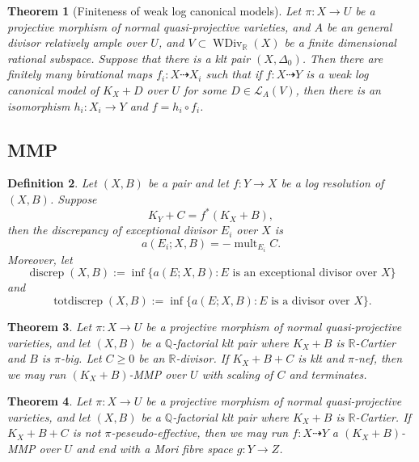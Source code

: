 \documentclass{article}
\newtheorem{defn}{Definition}[subsection]
\newtheorem{thm}[defn]{Theorem}
\begin{document}
\begin{thm}[Finiteness of weak log canonical models]\label{finitewlcm}
\cite[Theorem E]{birkarExistenceMinimalModels2009}
   Let $\pi:X\to U$ be a projective morphism of normal quasi-projective varieties, and $A$ be an general divisor relatively ample over $U$, and $V \subset \operatorname{WDiv}_{\mathbb{R}}(X)$ be a finite dimensional rational subspace. Suppose that there is a klt pair $(X,\Delta_{0})$. Then there are finitely many birational maps $f_{i}:X \dashrightarrow X_{i}$ such that if $f:X \dashrightarrow  Y$ is a weak log canonical model of $K_{X}+D$ over $U$ for some $D \in \mathcal{L}_{A}(V)$, then there is an isomorphism  $h_{i}:X_{i} \to Y$  and $f=h_{i}\circ f_{i}$.  

\end{thm}


\subsection{MMP}
\begin{defn}
  Let $(X,B)$ be a pair  and let  $f:Y\to X$ be a log resolution of $(X,B)$. Suppose
  \[
  K_{Y}+C=f^*(K_{X}+B)
  ,\]
then the discrepancy  of exceptional divisor $E_{i}$ over $X$ is
\[
  a(E_{i};X,B)=-\operatorname{mult}_{E_{i}}C
.\]
 Moreover, let
\[
  \operatorname{discrep}(X, B) := \operatorname{inf}\{a(E; X, B) : E \text{ is an exceptional divisor over } X \}
\]
and
\[
  \operatorname{totdiscrep}(X, B) :=\operatorname{inf}\{a(E; X, B) : E \text{ is a divisor over } X\}.
\]
\end{defn}
\begin{thm}
\cite[Corollary 1.4.2]{birkarExistenceMinimalModels2009}Let $ \pi:X\to U $ be a projective morphism of normal quasi-projective varieties, and let $(X,B)$ be a $\mathbb{Q}$-factorial klt pair where $K_{X}+B$ is $\mathbb{R}$-Cartier and $B$ is $\pi$-big. Let $C\geqslant0$ be an $\mathbb{R}$-divisor. If $K_{X}+B+C$ is klt and  $\pi$-nef, then we may run $(K_{X}+B)$-MMP over $U$  with scaling of $C$ and  terminates.
\end{thm}
\begin{thm}\label{notpseudoeffmfs}
  \cite[Corollary 1.3.3]{birkarExistenceMinimalModels2009}Let $ \pi:X\to U $ be a projective morphism of normal quasi-projective varieties, and let $(X,B)$ be a $\mathbb{Q}$-factorial klt pair where $K_{X}+B$ is $\mathbb{R}$-Cartier.  If $K_{X}+B+C$ is  not $\pi$-peseudo-effective, then we may run $f:X\dashrightarrow Y$ a $(K_{X}+B)$-MMP over   $U$ and end with a Mori fibre space $g:Y\to Z$.
\end{thm}
\end{document}
